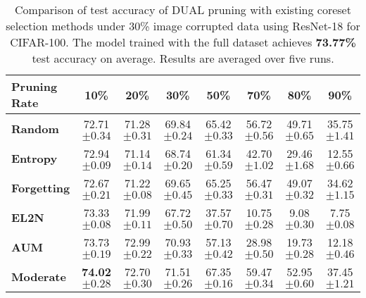 \begin{table}[ht]
\caption{\label{tab:image_corruption_30_cifar}Comparison of test accuracy of DUAL pruning with existing coreset selection methods under 30\% image corrupted data using ResNet-18 for CIFAR-100. The model trained with the full dataset achieves \textbf{73.77\%} test accuracy on average. Results are averaged over five runs.}
\setlength{\tabcolsep}{3.1pt}
\centering
\begin{tabular}{lccccccc}
    \toprule
    \textbf{Pruning Rate} & \textbf{10\%} & \textbf{20\%} & \textbf{30\%} & \textbf{50\%} & \textbf{70\%} & \textbf{80\%} & \textbf{90\%} \\
    \midrule
    \textbf{Random} & 72.71 \scriptsize{$ \pm 0.34 $} & 71.28 \scriptsize{$ \pm 0.31 $}  & 69.84 \scriptsize{$ \pm 0.24 $} & 65.42 \scriptsize{$ \pm 0.33 $} & 56.72 \scriptsize{$ \pm 0.56 $} & 49.71 \scriptsize{$ \pm 0.65 $} & 35.75 \scriptsize{$ \pm 1.41 $} \\
    
    \textbf{Entropy} & 72.94 \scriptsize{$ \pm 0.09 $} & 71.14 \scriptsize{$ \pm 0.14 $} & 68.74 \scriptsize{$ \pm 0.20 $} & 61.34 \scriptsize{$ \pm 0.59 $} & 42.70 \scriptsize{$ \pm 1.02 $} & 29.46 \scriptsize{$ \pm 1.68 $} & 12.55 \scriptsize{$ \pm 0.66 $} \\
    
    \textbf{Forgetting} & 72.67 \scriptsize{$ \pm 0.21 $} & 71.22 \scriptsize{$ \pm 0.08 $} & 69.65 \scriptsize{$ \pm 0.45 $} & 65.25 \scriptsize{$ \pm 0.33 $} & 56.47 \scriptsize{$ \pm 0.31 $} &49.07  \scriptsize{$ \pm 0.32 $} & 34.62 \scriptsize{$ \pm 1.15 $} \\
    
    \textbf{EL2N} & 73.33 \scriptsize{$ \pm 0.08 $} & 71.99 \scriptsize{$ \pm 0.11 $} & 67.72 \scriptsize{$ \pm 0.50 $} & 37.57 \scriptsize{$ \pm 0.70 $} & 10.75 \scriptsize{$ \pm 0.28 $} & 9.08 \scriptsize{$ \pm 0.30 $} & 7.75 \scriptsize{$ \pm 0.08 $} \\
    
    \textbf{AUM} & 73.73 \scriptsize{$ \pm 0.19 $} & 72.99 \scriptsize{$ \pm 0.22 $} & 70.93 \scriptsize{$ \pm 0.33 $} & 57.13 \scriptsize{$ \pm 0.42 $} & 28.98 \scriptsize{$ \pm 0.50 $} & 19.73 \scriptsize{$ \pm 0.28 $} & 12.18 \scriptsize{$ \pm 0.46 $} \\
    
    \textbf{Moderate} & \textbf{74.02} \scriptsize{$ \pm 0.28 $} & 72.70 \scriptsize{$ \pm 0.30 $} & 71.51 \scriptsize{$ \pm 0.26 $} & 67.35 \scriptsize{$ \pm 0.16 $} & 59.47 \scriptsize{$ \pm 0.34 $} & 52.95 \scriptsize{$ \pm 0.60 $} & 37.45 \scriptsize{$ \pm 1.21 $} \\
    

\end{tabular}
\end{table}
